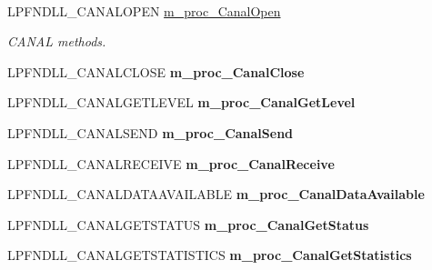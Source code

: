 \paragraph*{}
\begin{DoxyCompactItemize}
\item 
\hypertarget{class_c_dll_wrapper_a047d3f12fabdb4fc036ebd613b980e95}{
LPFNDLL\_\-CANALOPEN \hyperlink{class_c_dll_wrapper_a047d3f12fabdb4fc036ebd613b980e95}{m\_\-proc\_\-CanalOpen}}
\label{de/d52/class_c_dll_wrapper_a047d3f12fabdb4fc036ebd613b980e95}

\begin{DoxyCompactList}\small\item\em CANAL methods. \end{DoxyCompactList}\item 
\hypertarget{class_c_dll_wrapper_ab02b5ffea57c2c87952737b3b4b4440c}{
LPFNDLL\_\-CANALCLOSE {\bfseries m\_\-proc\_\-CanalClose}}
\label{de/d52/class_c_dll_wrapper_ab02b5ffea57c2c87952737b3b4b4440c}

\item 
\hypertarget{class_c_dll_wrapper_a2b8db1e09e7bfb5995d5fd5d1bc251a3}{
LPFNDLL\_\-CANALGETLEVEL {\bfseries m\_\-proc\_\-CanalGetLevel}}
\label{de/d52/class_c_dll_wrapper_a2b8db1e09e7bfb5995d5fd5d1bc251a3}

\item 
\hypertarget{class_c_dll_wrapper_a68dc9e1dcec6726147c7fa18ed3783d4}{
LPFNDLL\_\-CANALSEND {\bfseries m\_\-proc\_\-CanalSend}}
\label{de/d52/class_c_dll_wrapper_a68dc9e1dcec6726147c7fa18ed3783d4}

\item 
\hypertarget{class_c_dll_wrapper_aceb0b5e04b78b32f2d21ee85eb8427c9}{
LPFNDLL\_\-CANALRECEIVE {\bfseries m\_\-proc\_\-CanalReceive}}
\label{de/d52/class_c_dll_wrapper_aceb0b5e04b78b32f2d21ee85eb8427c9}

\item 
\hypertarget{class_c_dll_wrapper_ac8b520a8f1ecf67ce1cbdd901da07ed6}{
LPFNDLL\_\-CANALDATAAVAILABLE {\bfseries m\_\-proc\_\-CanalDataAvailable}}
\label{de/d52/class_c_dll_wrapper_ac8b520a8f1ecf67ce1cbdd901da07ed6}

\item 
\hypertarget{class_c_dll_wrapper_afa48b0082fdfbef5d5a013489a849aec}{
LPFNDLL\_\-CANALGETSTATUS {\bfseries m\_\-proc\_\-CanalGetStatus}}
\label{de/d52/class_c_dll_wrapper_afa48b0082fdfbef5d5a013489a849aec}

\item 
\hypertarget{class_c_dll_wrapper_a25bcd62739447424ab227ebbfa05f813}{
LPFNDLL\_\-CANALGETSTATISTICS {\bfseries m\_\-proc\_\-CanalGetStatistics}}
\label{de/d52/class_c_dll_wrapper_a25bcd62739447424ab227ebbfa05f813}


\end{DoxyCompactItemize}
